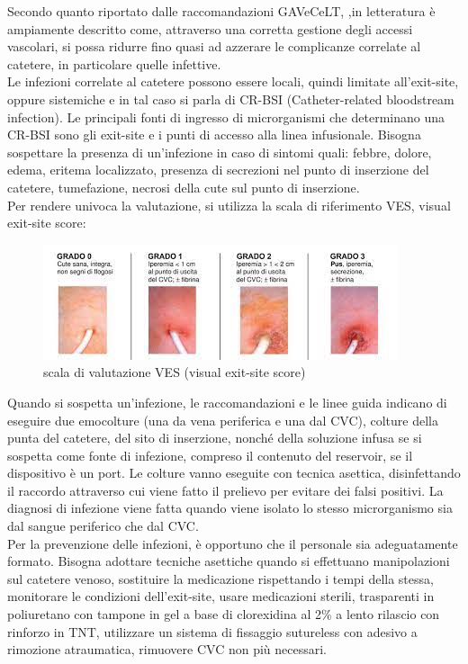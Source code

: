 Secondo quanto riportato dalle raccomandazioni GAVeCeLT, ,in letteratura è ampiamente descritto come, attraverso una 
corretta gestione degli accessi vascolari, si possa ridurre fino quasi ad azzerare le complicanze correlate al 
catetere, in particolare quelle infettive\cite{GAVECELTracc2021}.\\
Le infezioni correlate al catetere possono essere locali, quindi limitate all’exit-site, oppure sistemiche e in tal 
caso si parla di CR-BSI (Catheter-related bloodstream infection). Le principali fonti di ingresso di microrganismi 
che determinano una CR-BSI sono gli exit-site e i punti di accesso alla linea infusionale. 
Bisogna sospettare la presenza di un’infezione in caso di sintomi quali: febbre, dolore, edema, eritema localizzato, 
presenza di secrezioni nel punto di inserzione del catetere, tumefazione, necrosi della cute sul punto di inserzione\cite{AIOMCVC}.\\
Per rendere univoca la valutazione, si utilizza la scala di riferimento VES, visual exit-site score:

\begin{figure}[H]
    \begin{center}
    \includegraphics[width=0.7\columnwidth]{img/VES.jpeg}
    \end{center}
    \caption{scala di valutazione VES (visual exit-site score)
    \cite{img51}}

\end{figure}

Quando si sospetta un’infezione, le raccomandazioni e le linee guida indicano di eseguire due emocolture 
(una da vena periferica e una dal CVC), colture della punta del catetere, del sito di inserzione, nonché della 
soluzione infusa se si sospetta come fonte di infezione, compreso il contenuto del reservoir, se il dispositivo è un 
port. Le colture vanno eseguite con tecnica asettica, disinfettando il raccordo attraverso cui viene fatto il 
prelievo per evitare dei falsi positivi. La diagnosi di infezione viene fatta quando viene isolato lo stesso 
microrganismo sia dal sangue periferico che dal CVC\cite{AIOMCVC}.\\
Per la prevenzione delle infezioni, è opportuno che il personale sia adeguatamente formato. Bisogna adottare tecniche 
asettiche quando si effettuano manipolazioni sul catetere venoso, sostituire la medicazione rispettando i tempi della 
stessa, monitorare le condizioni dell’exit-site, usare medicazioni sterili, trasparenti in poliuretano con tampone 
in gel a base di clorexidina al 2\% a lento rilascio con rinforzo in TNT, utilizzare un sistema di fissaggio 
sutureless con adesivo a rimozione atraumatica, rimuovere CVC non più necessari\cite{AIOMCVC}.\\

